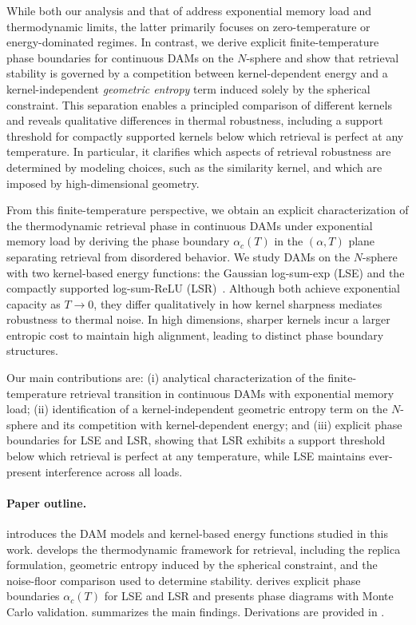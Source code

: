 \documentclass{article}
\theoremstyle{plain}
\theoremstyle{definition}
\theoremstyle{remark}
\begin{document}
While both our analysis and that of \citet{lucibello2024exponential} address exponential memory load and thermodynamic limits, the latter primarily focuses on zero-temperature or energy-dominated regimes. In contrast, we derive explicit finite-temperature phase boundaries for continuous DAMs on the $N$-sphere and show that retrieval stability is governed by a competition between kernel-dependent energy and a kernel-independent \emph{geometric entropy} term induced solely by the spherical constraint. This separation enables a principled comparison of different kernels and reveals qualitative differences in thermal robustness, including a support threshold for compactly supported kernels below which retrieval is perfect at any temperature. In particular, it clarifies which aspects of retrieval robustness are determined by modeling choices, such as the similarity kernel, and which are imposed by high-dimensional geometry.

From this finite-temperature perspective, we obtain an explicit characterization of the thermodynamic retrieval phase in continuous DAMs under exponential memory load by deriving the phase boundary $\alpha_c(T)$ in the $(\alpha,T)$ plane separating retrieval from disordered behavior. We study DAMs on the $N$-sphere with two kernel-based energy functions: the Gaussian log-sum-exp (LSE) and the compactly supported log-sum-ReLU (LSR)~\citep{hoover2025dense}. Although both achieve exponential capacity as $T \to 0$, they differ qualitatively in how kernel sharpness mediates robustness to thermal noise. In high dimensions, sharper kernels incur a larger entropic cost to maintain high alignment, leading to distinct phase boundary structures.

Our main contributions are: (i) analytical characterization of the finite-temperature retrieval transition in continuous DAMs with exponential memory load; (ii) identification of a kernel-independent geometric entropy term on the $N$-sphere and its competition with kernel-dependent energy; and (iii) explicit phase boundaries for LSE and LSR, showing that LSR exhibits a support threshold below which retrieval is perfect at any temperature, while LSE maintains ever-present interference across all loads.

\paragraph{Paper outline.}
 introduces the DAM models and kernel-based energy functions studied in this work. 
 develops the thermodynamic framework for retrieval, including the replica formulation, geometric entropy induced by the spherical constraint, and the noise-floor comparison used to determine stability. 
 derives explicit phase boundaries $\alpha_c(T)$ for LSE and LSR and presents phase diagrams with Monte Carlo validation. 
 summarizes the main findings. 
Derivations are provided in .
\end{document}
